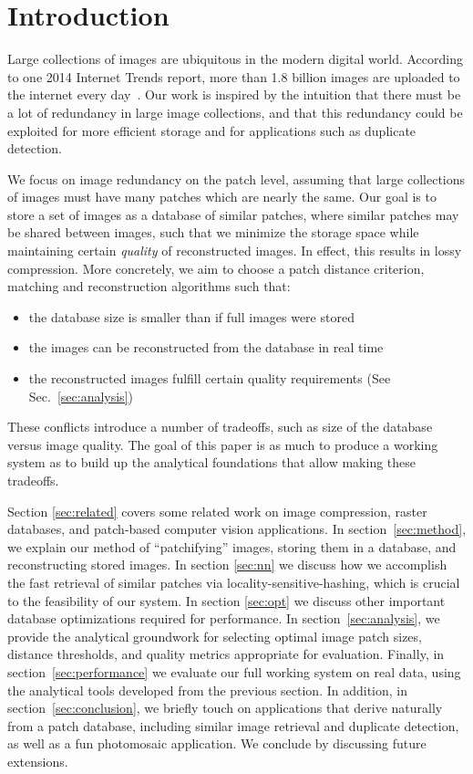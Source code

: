 \section{Introduction}

Large collections of images are ubiquitous in the modern digital world.
According to one 2014 Internet Trends report,
more than 1.8 billion images are uploaded to the internet every day~\cite{meeker2014internet}.
Our work is inspired by the intuition that there must be a lot of redundancy
in large image collections, and that this redundancy could
be exploited for more efficient storage and for applications such as duplicate detection.

We focus on image redundancy on the patch level, assuming that large collections
of images must have many patches which are nearly the same.
Our goal is to store a set of images as a database of
similar patches, where similar patches may be shared between images,
 such that we minimize the storage space while maintaining certain \emph{quality}
of reconstructed images. In effect, this results in lossy compression. More concretely,
we aim to choose a patch distance criterion, matching and reconstruction algorithms such
that:
\begin{itemize}
\item the database size is smaller than if full images were stored
\item the images can be reconstructed from the database in real time
\item the reconstructed images fulfill certain quality requirements (See Sec.~\ref{sec:analysis})
\end{itemize}
These conflicts introduce a number of tradeoffs, such as size of
the database versus image quality.
The goal of this paper is as much to produce a working system as to
build up the analytical foundations that allow making these tradeoffs.

Section \ref{sec:related} covers some related work on image compression, raster databases, and patch-based computer vision applications.
In section~\ref{sec:method}, we explain our method of ``patchifying'' images,
storing them in a database, and reconstructing stored images. 
In section \ref{sec:nn} we discuss how we accomplish the fast retrieval of similar patches via locality-sensitive-hashing, which is crucial to the feasibility of our system. In section \ref{sec:opt} we discuss other important database optimizations required for performance. 
In section~\ref{sec:analysis}, we provide the analytical groundwork for
selecting optimal image patch sizes, distance thresholds, and quality metrics
appropriate for evaluation. Finally, in section~\ref{sec:performance}
we evaluate our full working system on real data, using the analytical tools developed from the previous section. 
In addition, in section~\ref{sec:conclusion}, we briefly touch on applications that derive naturally
from a patch database, including similar image retrieval and duplicate detection, as well as a fun photomosaic application. We conclude by discussing future extensions.
